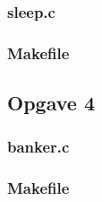 \subsubsection*{sleep.c}

\subsubsection*{Makefile}


\subsection*{Opgave 4}
\subsubsection*{banker.c}


\subsubsection*{Makefile}


